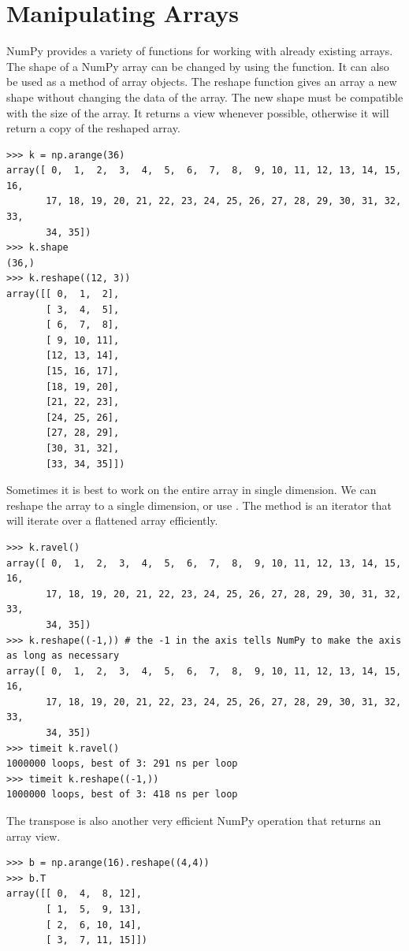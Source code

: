 \section*{Manipulating Arrays}
NumPy provides a variety of functions for working with already existing arrays.
The shape of a NumPy array can be changed by using the  function.
It can also be used as a method of array objects.
The reshape function gives an array a new shape without changing the data of the array.
The new shape must be compatible with the size of the array.
It returns a view whenever possible, otherwise it will return a copy of the reshaped array.
\begin{lstlisting}
>>> k = np.arange(36)
array([ 0,  1,  2,  3,  4,  5,  6,  7,  8,  9, 10, 11, 12, 13, 14, 15, 16,
       17, 18, 19, 20, 21, 22, 23, 24, 25, 26, 27, 28, 29, 30, 31, 32, 33,
       34, 35])
>>> k.shape
(36,)
>>> k.reshape((12, 3))
array([[ 0,  1,  2],
       [ 3,  4,  5],
       [ 6,  7,  8],
       [ 9, 10, 11],
       [12, 13, 14],
       [15, 16, 17],
       [18, 19, 20],
       [21, 22, 23],
       [24, 25, 26],
       [27, 28, 29],
       [30, 31, 32],
       [33, 34, 35]])
\end{lstlisting}
Sometimes it is best to work on the entire array in single dimension.
We can reshape the array to a single dimension, or use .
The  method is an iterator that will iterate over a flattened array efficiently.
\begin{lstlisting}
>>> k.ravel()
array([ 0,  1,  2,  3,  4,  5,  6,  7,  8,  9, 10, 11, 12, 13, 14, 15, 16,
       17, 18, 19, 20, 21, 22, 23, 24, 25, 26, 27, 28, 29, 30, 31, 32, 33,
       34, 35])
>>> k.reshape((-1,)) # the -1 in the axis tells NumPy to make the axis as long as necessary
array([ 0,  1,  2,  3,  4,  5,  6,  7,  8,  9, 10, 11, 12, 13, 14, 15, 16,
       17, 18, 19, 20, 21, 22, 23, 24, 25, 26, 27, 28, 29, 30, 31, 32, 33,
       34, 35])
>>> timeit k.ravel()
1000000 loops, best of 3: 291 ns per loop
>>> timeit k.reshape((-1,))
1000000 loops, best of 3: 418 ns per loop
\end{lstlisting}
The transpose is also another very efficient NumPy operation that returns an array view.   
\begin{lstlisting}
>>> b = np.arange(16).reshape((4,4))
>>> b.T
array([[ 0,  4,  8, 12],
       [ 1,  5,  9, 13],
       [ 2,  6, 10, 14],
       [ 3,  7, 11, 15]])
\end{lstlisting}

